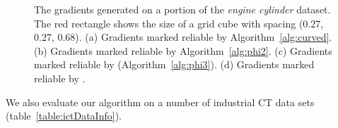 \begin{figure}
    \centering
\caption{The gradients generated on a portion of the \textit{engine cylinder} dataset.
The red rectangle shows the size of a grid cube
with spacing (0.27, 0.27, 0.68).
(a) Gradients marked reliable by Algorithm~\ref{alg:curved}. 
(b) Gradients marked reliable by Algorithm~\ref{alg:phi2}.
(c) Gradients marked reliable by \protect\FindReliable 
(Algorithm~\ref{alg:phi3}). 
(d) Gradients marked reliable by \protect\ReliGrad.}
\label{fig:setA.crop1.grads}
\end{figure}

We also evaluate our algorithm on a number of industrial CT data sets (table~\ref{table:ictDataInfo}). 

